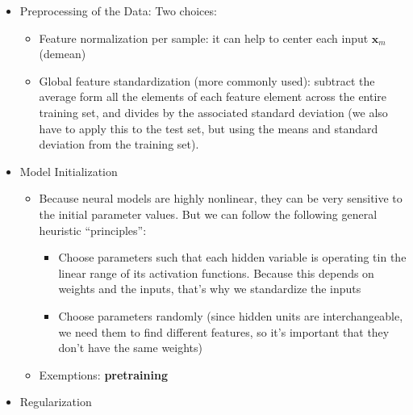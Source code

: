 \documentclass[
]{book}
\begin{document}
\begin{itemize}
\item
  Preprocessing of the Data: Two choices:

  \begin{itemize}
  \item
    Feature normalization per sample: it can help to center each input \(\mathbf{x}_m\) (demean)
  \item
    Global feature standardization (more commonly used): subtract the average form all the elements of each feature element across the entire training set, and divides by the associated standard deviation (we also have to apply this to the test set, but using the means and standard deviation from the training set).
  \end{itemize}
\item
  Model Initialization

  \begin{itemize}
  \item
    Because neural models are highly nonlinear, they can be very sensitive to the initial parameter values. But we can follow the following general heuristic ``principles'':

    \begin{itemize}
    \item
      Choose parameters such that each hidden variable is operating tin the linear range of its activation functions. Because this depends on weights and the inputs, that's why we standardize the inputs
    \item
      Choose parameters randomly (since hidden units are interchangeable, we need them to find different features, so it's important that they don't have the same weights)
    \end{itemize}
  \item
    Exemptions: \textbf{pretraining}
  \end{itemize}
\item
  Regularization


\end{itemize}
\end{document}
